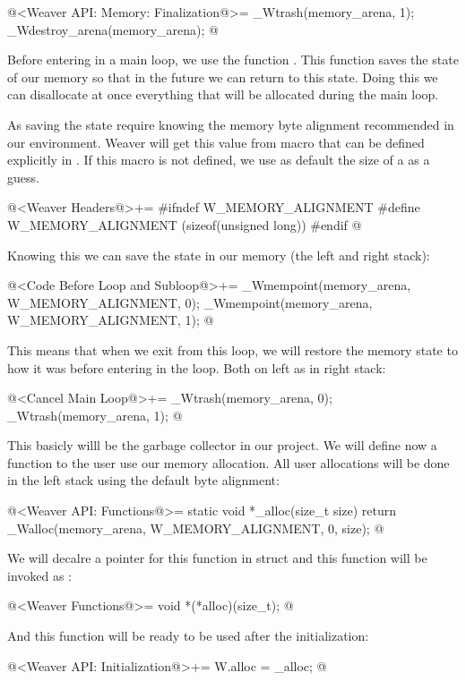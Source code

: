\iniciocodigo
  @<Weaver API: Memory: Finalization@>=
_Wtrash(memory_arena, 1);
_Wdestroy_arena(memory_arena);
@
\fimcodigo

Before entering in a main loop, we use the
function . This function saves the state of
our memory so that in the future we can return to this state. Doing
this we can disallocate at once everything that will be allocated
during the main loop.

As saving the state require knowing the memory byte alignment
recommended in our environment. Weaver will get this value from
macro  that can be defined explicitly
in . If this macro is not defined, we use as
default the size of a  as a guess.

\iniciocodigo
@<Weaver Headers@>+=
#ifndef W_MEMORY_ALIGNMENT
#define W_MEMORY_ALIGNMENT (sizeof(unsigned long))
#endif
@
\fimcodigo

Knowing this we can save the state in our memory (the left and right
stack):

\iniciocodigo
@<Code Before Loop and Subloop@>+=
_Wmempoint(memory_arena, W_MEMORY_ALIGNMENT, 0);
_Wmempoint(memory_arena, W_MEMORY_ALIGNMENT, 1);
@
\fimcodigo

This means that when we exit from this loop, we will restore the
memory state to how it was before entering in the loop. Both on left
as in right stack:

\iniciocodigo
@<Cancel Main Loop@>+=
_Wtrash(memory_arena, 0);
_Wtrash(memory_arena, 1);
@
\fimcodigo

This basicly willl be the garbage collector in our project. We will
define now a function to the user use our memory allocation. All user
allocations will be done in the left stack using the default byte
alignment:

\iniciocodigo

@<Weaver API: Functions@>=
static void *_alloc(size_t size){
  return _Walloc(memory_arena, W_MEMORY_ALIGNMENT, 0, size);
}
@
\fimcodigo

We will decalre a pointer for this function in struct  and this function will be invoked as :

\iniciocodigo
@<Weaver Functions@>=
void *(*alloc)(size_t);
@
\fimcodigo

And this function will be ready to be used after the initialization:

\iniciocodigo
@<Weaver API: Initialization@>+=
W.alloc = _alloc;
@
\fimcodigo


